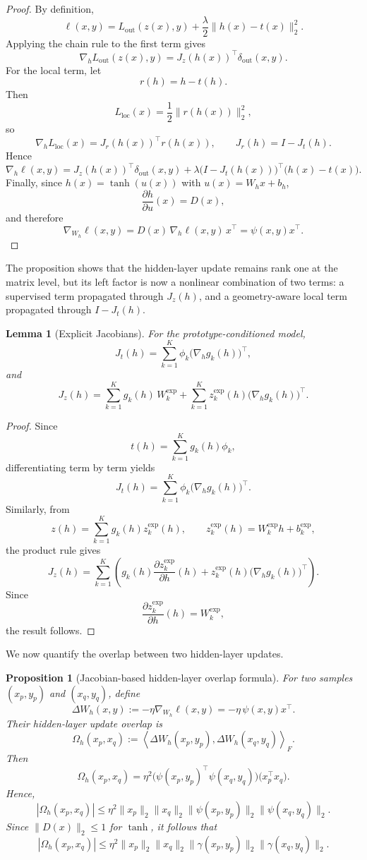 \documentclass{article}
\newtheorem{lem}[thm]{Lemma}
\newtheorem{prop}[thm]{Proposition}
\theoremstyle{definition}
\theoremstyle{remark}
\begin{document}
\begin{proof}
By definition,
\[
\ell(x,y)=L_{\mathrm{out}}(z(x),y)+\frac{\lambda}{2}\|h(x)-t(x)\|_2^2.
\]
Applying the chain rule to the first term gives
\[
\nabla_h L_{\mathrm{out}}(z(x),y)=J_z(h(x))^\top \delta_{\mathrm{out}}(x,y).
\]
For the local term, let
\[
r(h)=h-t(h).
\]
Then
\[
L_{\mathrm{loc}}(x)=\frac{1}{2}\|r(h(x))\|_2^2,
\]
so
\[
\nabla_h L_{\mathrm{loc}}(x)
=
J_r(h(x))^\top r(h(x)),
\qquad
J_r(h)=I-J_t(h).
\]
Hence
\[
\nabla_h \ell(x,y)
=
J_z(h(x))^\top \delta_{\mathrm{out}}(x,y)
+
\lambda\bigl(I-J_t(h(x))\bigr)^\top \bigl(h(x)-t(x)\bigr).
\]
Finally, since \(h(x)=\tanh(u(x))\) with \(u(x)=W_hx+b_h\),
\[
\frac{\partial h}{\partial u}(x)=D(x),
\]
and therefore
\[
\nabla_{W_h}\ell(x,y)
=
D(x)\,\nabla_h \ell(x,y)\,x^\top
=
\psi(x,y)x^\top.
\]
\end{proof}

The proposition shows that the hidden-layer update remains rank one at the
matrix level, but its left factor is now a nonlinear combination of two terms:
a supervised term propagated through \(J_z(h)\), and a geometry-aware local
term propagated through \(I-J_t(h)\).

\begin{lem}[Explicit Jacobians]
\label{lem:explicit_hidden_jacobians}
For the prototype-conditioned model,
\[
J_t(h)
=
\sum_{k=1}^K \phi_k \bigl(\nabla_h g_k(h)\bigr)^\top,
\]
and
\[
J_z(h)
=
\sum_{k=1}^K g_k(h)\,W_k^{\mathrm{exp}}
+
\sum_{k=1}^K z_k^{\mathrm{exp}}(h)\bigl(\nabla_h g_k(h)\bigr)^\top.
\]
\end{lem}

\begin{proof}
Since
\[
t(h)=\sum_{k=1}^K g_k(h)\phi_k,
\]
differentiating term by term yields
\[
J_t(h)=\sum_{k=1}^K \phi_k \bigl(\nabla_h g_k(h)\bigr)^\top.
\]
Similarly, from
\[
z(h)=\sum_{k=1}^K g_k(h)z_k^{\mathrm{exp}}(h),
\qquad
z_k^{\mathrm{exp}}(h)=W_k^{\mathrm{exp}}h+b_k^{\mathrm{exp}},
\]
the product rule gives
\[
J_z(h)
=
\sum_{k=1}^K
\left(
g_k(h)\frac{\partial z_k^{\mathrm{exp}}}{\partial h}(h)
+
z_k^{\mathrm{exp}}(h)\bigl(\nabla_h g_k(h)\bigr)^\top
\right).
\]
Since
\[
\frac{\partial z_k^{\mathrm{exp}}}{\partial h}(h)=W_k^{\mathrm{exp}},
\]
the result follows.
\end{proof}

We now quantify the overlap between two hidden-layer updates.

\begin{prop}[Jacobian-based hidden-layer overlap formula]
\label{prop:hidden_overlap_formula}
For two samples \((x_p,y_p)\) and \((x_q,y_q)\), define
\[
\Delta W_h(x,y):=-\eta \nabla_{W_h}\ell(x,y)
=
-\eta\,\psi(x,y)x^\top.
\]
Their hidden-layer update overlap is
\[
\Omega_h(x_p,x_q)
:=
\left\langle
\Delta W_h(x_p,y_p),\Delta W_h(x_q,y_q)
\right\rangle_F.
\]
Then
\[
\Omega_h(x_p,x_q)
=
\eta^2\bigl(\psi(x_p,y_p)^\top \psi(x_q,y_q)\bigr)
\bigl(x_p^\top x_q\bigr).
\]
Hence,
\[
|\Omega_h(x_p,x_q)|
\le
\eta^2
\|x_p\|_2\|x_q\|_2
\|\psi(x_p,y_p)\|_2
\|\psi(x_q,y_q)\|_2.
\]
Since \(\|D(x)\|_2\le 1\) for \(\tanh\), it follows that
\[
|\Omega_h(x_p,x_q)|
\le
\eta^2
\|x_p\|_2\|x_q\|_2
\|\gamma(x_p,y_p)\|_2
\|\gamma(x_q,y_q)\|_2.
\]
\end{prop}
\end{document}
